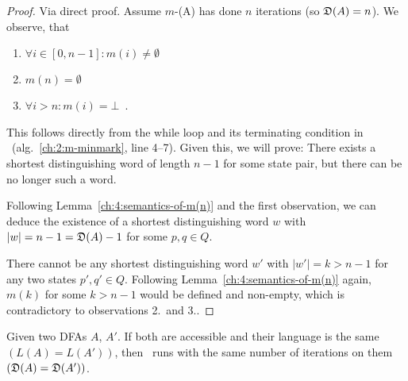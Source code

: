 \begin{proof}
	Via direct proof. Assume $m$-\CompDist(A) has done $n$ iterations (so $\mathfrak{D}(A) = n$). We observe, that
	\begin{enumerate}
		\item $\forall i \in [0,n-1]\colon m(i) \neq \emptyset$
		\item $m(n)= \emptyset$
		\item $\forall i > n\colon m(i)= \bot$\ .
	\end{enumerate}
	This follows directly from the while loop and its terminating condition in \CompDist\ (alg.~\ref{ch:2:m-minmark}, line 4--7). Given this, we will prove: There exists a shortest distinguishing word of length $n-1$ for some state pair, but there can be no longer such a word.

	
	Following Lemma~\ref{ch:4:semantics-of-m(n)} and the first observation, we can deduce the existence of a shortest distinguishing word $w$ with $|w| = n-1 = \mathfrak{D}(A)-1$ for some $p,q \in Q$.
	
	
	There cannot be any shortest distinguishing word $w'$ with $|w'| = k > n-1$ for any two states $p',q'\in Q$. Following Lemma~\ref{ch:4:semantics-of-m(n)} again, $m(k)$ for some $k > n-1$ would be defined and non-empty, which is contradictory to observations 2.\ and 3..
\end{proof}

\begin{theorem}\label{ch:4:th-D}
	Given two DFAs $A$, $A'$. If both are accessible and their language is the same $(L(A) = L(A'))$, then \CompDist\ runs with the same number of iterations on them $(\mathfrak{D}(A) = \mathfrak{D}(A'))$.
\end{theorem}

